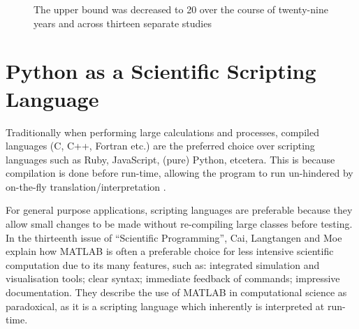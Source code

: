 \documentclass{report}
\begin{document}
   	\begin{figure}[h]
    	\begin{center}
    		\caption{The upper bound was decreased to 20 over the course of twenty-nine years and across thirteen separate studies \cite{Rokicki2010}}
			\label{fig:godsnumbergraph}
		\end{center}
	\end{figure}

    
    \section{Python as a Scientific Scripting Language}
    Traditionally when performing large calculations and processes, compiled languages (C, C++, Fortran etc.) are the preferred choice over scripting languages such as Ruby, JavaScript, (pure) Python, etcetera. This is because compilation is done before run-time, allowing the program to run un-hindered by on-the-fly translation/interpretation \cite{Cai2005}.
    
    For general purpose applications, scripting languages are preferable because they allow small changes to be made without re-compiling large classes before testing. In the thirteenth issue of \enquote{Scientific Programming}, Cai, Langtangen and Moe \cite{Cai2005} explain how MATLAB is often a preferable choice for less intensive scientific computation due to its many features, such as: integrated simulation and visualisation tools; clear syntax; immediate feedback of commands; impressive documentation. They describe the use of MATLAB in computational science as paradoxical, as it is a scripting language which inherently is interpreted at run-time.
    
\end{document}
